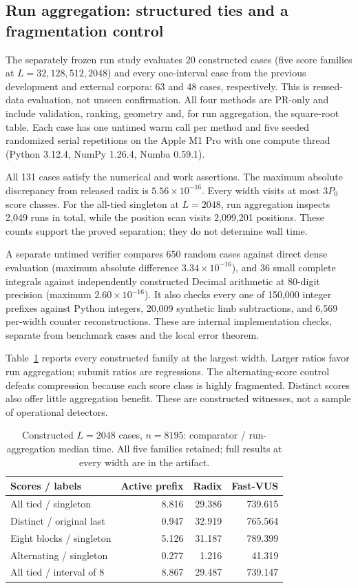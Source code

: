 \subsection{Run aggregation: structured ties and a fragmentation control}
The separately frozen run study evaluates 20 constructed cases (five score
families at $L=32,128,512,2048$) and every one-interval case from the previous
development and external corpora: 63 and 48 cases, respectively. This is
reused-data evaluation, not unseen confirmation. All four methods are PR-only
and include validation, ranking, geometry and, for run aggregation, the
square-root table. Each case has one untimed warm call per method and five
seeded randomized serial repetitions on the Apple M1 Pro with one compute
thread (Python 3.12.4, NumPy 1.26.4, Numba 0.59.1).

All 131 cases satisfy the numerical and work assertions. The maximum absolute
discrepancy from released radix is $5.56\times10^{-16}$. Every width visits at
most $3P_0$ score classes. For the all-tied singleton at $L=2048$, run aggregation
inspects 2,049 runs in total, while the position scan visits 2,099,201 positions.
These counts support the proved separation; they do not determine wall time.

A separate untimed verifier compares 650 random cases against direct dense
evaluation (maximum absolute difference $3.34\times10^{-16}$), and 36 small
complete integrals against independently constructed Decimal arithmetic at
80-digit precision (maximum $2.60\times10^{-16}$). It also checks every one of
150,000 integer prefixes against Python integers, 20,009 synthetic limb
subtractions, and 6,569 per-width counter reconstructions. These are internal
implementation checks, separate from benchmark cases and the local error theorem.

Table~\ref{tab:tie-structural} reports every constructed family at the largest
width. Larger ratios favor run aggregation; subunit ratios are regressions.
The alternating-score control defeats compression because each score class is
highly fragmented. Distinct scores also offer little aggregation benefit.
These are constructed witnesses, not a sample of operational detectors.

\begin{table}[t]
\centering\small
\caption{Constructed $L=2048$ cases, $n=8195$: comparator / run-aggregation median
time. All five families retained; full results at every width are in the artifact.}
\label{tab:tie-structural}
\begin{tabular}{lrrr}
\toprule
Scores / labels & Active prefix & Radix & Fast-VUS\\
\midrule
All tied / singleton & 8.816 & 29.386 & 739.615 \\
Distinct / original last & 0.947 & 32.919 & 765.564 \\
Eight blocks / singleton & 5.126 & 31.187 & 789.399 \\
Alternating / singleton & 0.277 & 1.216 & 41.319 \\
All tied / interval of 8 & 8.867 & 29.487 & 739.147 \\
\bottomrule
\end{tabular}
\end{table}

